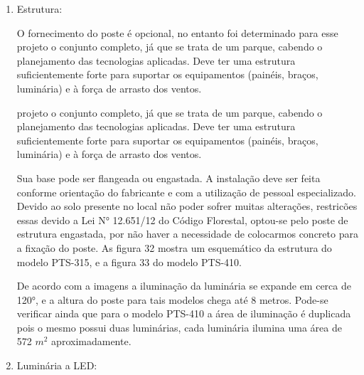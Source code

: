 \begin{enumerate}
	\item Estrutura:
		
	O fornecimento do poste é opcional, no entanto foi determinado para esse projeto o conjunto completo, já que se trata de um parque, cabendo o planejamento das tecnologias aplicadas. Deve ter uma estrutura suficientemente forte para suportar os equipamentos (painéis, braços, luminária) e à força de arrasto dos ventos.
	
	projeto o conjunto completo, já que se trata de um parque, cabendo o planejamento das tecnologias aplicadas. Deve ter uma estrutura suficientemente forte para suportar os equipamentos (painéis, braços, luminária) e à força de arrasto dos ventos. 
	
	Sua base pode ser flangeada ou engastada. A instalação deve ser feita conforme orientação do fabricante e com a utilização de pessoal especializado. Devido ao solo presente no local não poder sofrer muitas alterações, restricões essas devido a Lei N° 12.651/12 do Código Florestal, optou-se pelo poste de estrutura engastada, por não haver a necessidade de colocarmos concreto para a fixação do poste. As figura 32 mostra um esquemático da estrutura do modelo PTS-315, e a figura 33 do modelo PTS-410.

		De acordo com a imagens a iluminação da luminária se expande em cerca de 120°, e a altura do poste para tais modelos chega até 8 metros. Pode-se verificar ainda que  para o modelo PTS-410 a área de iluminação é duplicada pois o mesmo possui duas luminárias, cada luminária ilumina uma área  de 572 $m^{2}$ aproximadamente.


	\item Luminária a LED:
	

\end{enumerate}
